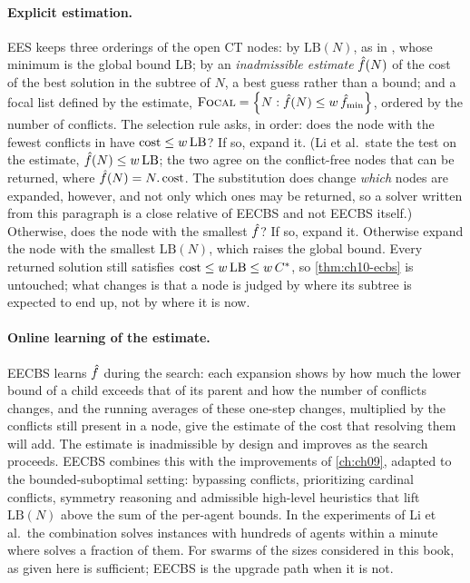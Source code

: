 \paragraph{Explicit estimation.}
EES keeps three orderings of the open CT nodes: by $\mathrm{LB}(N)$, as in
\ecbs, whose minimum is the global bound $\mathrm{LB}$; by an
\emph{inadmissible estimate} $\hat{f}(N)$ of the cost of the best
solution in the subtree of $N$, a best guess rather than a bound; and a focal
list defined by the estimate, $\textsc{Focal} = \left\{ N : \hat{f}(N) \le
w\,\hat{f}_{\min} \right\}$, ordered by the number of conflicts. The selection
rule asks, in order: does the node with the fewest conflicts in \Focal have
$\operatorname{cost} \le w\,\mathrm{LB}$? If so, expand it. (Li et al.\ state the test on
the estimate, $\hat{f}(N) \le w\,\mathrm{LB}$; the two agree on the
conflict-free nodes that can be returned, where $\hat{f}(N) =
N.\operatorname{cost}$. The substitution does change \emph{which} nodes are expanded,
however, and not only which ones may be returned, so a solver written from
this paragraph is a close relative of EECBS and not EECBS itself.) Otherwise,
does the node with
the smallest $\hat{f}$? If so, expand it. Otherwise expand the node with
the smallest $\mathrm{LB}(N)$, which raises the global bound. Every returned
solution still satisfies $\operatorname{cost} \le w\,\mathrm{LB} \le w\,C^*$, so
\cref{thm:ch10-ecbs} is untouched; what changes is that a node is judged by
where its subtree is expected to end up, not by where it is now.

\paragraph{Online learning of the estimate.}
EECBS learns $\hat{f}$ during the search: each expansion shows by how
much the lower bound of a child exceeds that of its parent and how the number
of conflicts changes, and the running averages of these one-step changes,
multiplied by the conflicts still present in a node, give the estimate of the
cost that resolving them will add. The estimate is inadmissible by design and
improves as the search proceeds. EECBS combines this with the \cbs
improvements of \cref{ch:ch09}, adapted to the bounded-suboptimal setting:
bypassing conflicts, prioritizing cardinal conflicts, symmetry reasoning and
admissible high-level heuristics that lift $\mathrm{LB}(N)$ above the sum of
the per-agent bounds. In the experiments of Li et al.\ the combination solves
instances with hundreds of agents within a minute where \ecbs solves a
fraction of them. For swarms of the sizes considered in this book, \ecbs as
given here is sufficient; EECBS is the upgrade path when it is not.

